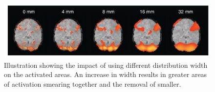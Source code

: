 \begin{figure}[H]                 
	\includegraphics[width=.8\textwidth]{figures/aBackground/smooth}  
	\caption{Illustration showing the impact of using different distribution width on the activated areas. An increase in width results in greater areas of activation smearing together and the removal of smaller. \cite{Poldrack2011}}
	\label{fig:back:smooth} 
\end{figure}  


